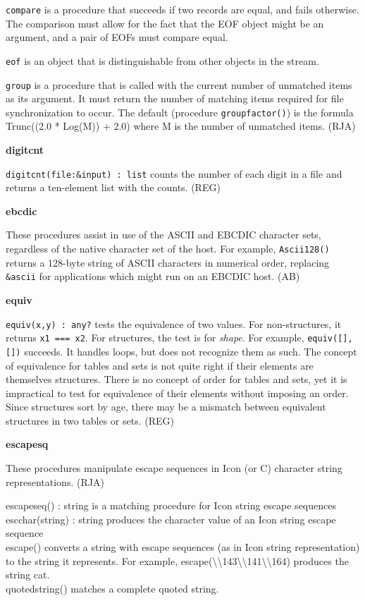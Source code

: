 \texttt{compare} is a procedure that succeeds if two records are
{\textquotedbl}equal{\textquotedbl}, and fails otherwise. The
comparison must allow for the fact that the EOF object might be an
argument, and a pair of EOFs must compare equal.

\texttt{eof} is an object that is distinguishable from other objects in
the stream.

\texttt{group} is a procedure that is called with the current number of
unmatched items as its argument. It must return the number of matching
items required for file synchronization to occur. The default
(procedure \texttt{groupfactor()}) is the formula Trunc((2.0 * Log(M))
+ 2.0) where M is the number of unmatched items. (RJA)

{\sffamily\bfseries
digitcnt}

\texttt{digitcnt(file:\&input) : list} counts the number of each digit
in a file and returns a ten-element list with the counts. (REG)

{\sffamily\bfseries
ebcdic}

These procedures assist in use of the ASCII and
EBCDIC character sets, regardless of the native character
set of the host. For example, \texttt{Ascii128()} returns a 128-byte
string of ASCII characters in numerical order, replacing
\texttt{\&ascii} for applications which might run on an EBCDIC host.
(AB)

{\sffamily\bfseries
equiv}

\texttt{equiv(x,y) : any?} tests the equivalence of two values. For
non-structures, it returns \texttt{x1 === x2}. For structures, the test
is for \textit{shape}. For example,
\texttt{equiv([],[])} succeeds. It handles loops, but does not
recognize them as such. The concept of equivalence for tables and sets
is not quite right if their elements are themselves structures. There
is no concept of order for tables and sets, yet it is impractical to
test for equivalence of their elements without imposing an order. Since
structures sort by {\textquotedbl}age{\textquotedbl}, there may be a
mismatch between equivalent structures in two tables or sets. (REG)

{\sffamily\bfseries
escapesq}

These procedures manipulate escape sequences in
Icon (or C) character string representations. (RJA)

\textsf{escapeseq() : string} is a matching procedure for Icon string
escape sequences\\
\textsf{escchar(string) : string} produces the character value of an
Icon string escape sequence\\
\textsf{escape()} converts a string with escape sequences (as in Icon
string representation) to the string it represents. For example,
\textsf{escape({\textquotedbl}{\textbackslash}{\textbackslash}143{\textbackslash}{\textbackslash}141{\textbackslash}{\textbackslash}164{\textquotedbl})}
produces the string \textsf{{\textquotedbl}cat{\textquotedbl}}.\\
\textsf{quotedstring()} matches a complete quoted string.

